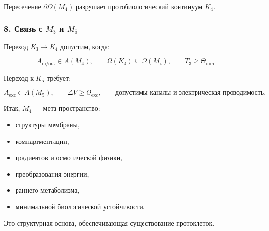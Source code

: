 Пересечение $\partial\Omega(M_4)$ разрушает протобиологический континуум $K_4$.

\subsubsection*{8. Связь с \texorpdfstring{$M_3$}{M_3} и \texorpdfstring{$M_5$}{M_5}}

Переход $K_3 \to K_4$ допустим, когда:

\[
A_{\mathrm{in/out}} \in A(M_4),
\qquad
\Omega(K_4) \subseteq \Omega(M_4),
\qquad
T_3 \ge \Theta_{\mathrm{dim}}.
\]

Переход к $K_5$ требует:

\[
A_{\mathrm{exc}} \in A(M_5),
\qquad
\Delta V \ge \Theta_{\mathrm{exc}},
\qquad
\text{допустимы каналы и электрическая проводимость}.
\]

Итак, $M_4$ — мета-пространство:

\begin{itemize}
    \item структуры мембраны,
    \item компартментации,
    \item градиентов и осмотической физики,
    \item преобразования энергии,
    \item раннего метаболизма,
    \item минимальной биологической устойчивости.
\end{itemize}

Это структурная основа, обеспечивающая существование протоклеток.
